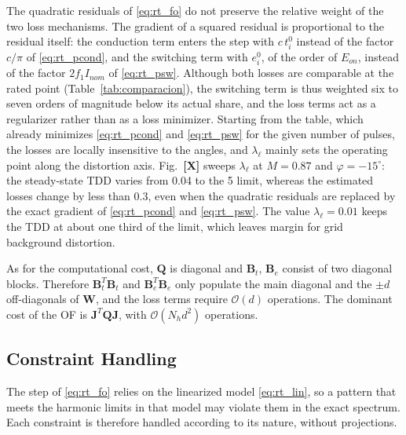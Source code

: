 \documentclass[conference]{IEEEtran}
\newcommand{\pct}{\text{\char`\%}}
\begin{document}
The quadratic residuals of \eqref{eq:rt_fo} do not preserve the relative
weight of the two loss mechanisms. The gradient of a squared residual is
proportional to the residual itself: the conduction term enters the step
with $c\,t_i^0$ instead of the factor $c/\pi$ of \eqref{eq:rt_pcond}, and the
switching term with $e_i^0$, of the order of $E_{on}$, instead of the factor
$2f_1I_{nom}$ of \eqref{eq:rt_psw}. Although both losses are comparable at
the rated point (Table~\ref{tab:comparacion}), the switching term is thus
weighted six to seven orders of magnitude below its actual share, and the
loss terms act as a regularizer rather than as a loss minimizer. Starting
from the table, which already minimizes \eqref{eq:rt_pcond} and
\eqref{eq:rt_psw} for the given number of pulses, the losses are locally
insensitive to the angles, and $\lambda_\ell$ mainly sets the operating point
along the distortion axis. Fig.~\textbf{[X]} sweeps $\lambda_\ell$ at
$M=0.87$ and $\varphi=-15^\circ$: the steady-state TDD varies from
0.04\pct{} to the 5\pct{} limit, whereas the estimated losses change by less
than 0.3\pct{}, even when the quadratic residuals are replaced by the exact
gradient of \eqref{eq:rt_pcond} and \eqref{eq:rt_psw}. The value
$\lambda_\ell=0.01$ keeps the TDD at about one third of the limit, which
leaves margin for grid background distortion.

As for the computational cost, $\mathbf{Q}$ is diagonal and $\mathbf{B}_t$,
$\mathbf{B}_e$ consist of two diagonal blocks. Therefore
$\mathbf{B}_t^T\mathbf{B}_t$ and $\mathbf{B}_e^T\mathbf{B}_e$ only populate
the main diagonal and the $\pm d$ off-diagonals of $\mathbf{W}$, and the
loss terms require $\mathcal{O}(d)$ operations. The dominant cost of the OF
is $\mathbf{J}^T\mathbf{Q}\mathbf{J}$, with $\mathcal{O}(N_h d^2)$
operations.

\subsection{Constraint Handling}
\label{subsec:rt_con}

The step of \eqref{eq:rt_fo} relies on the linearized model
\eqref{eq:rt_lin}, so a pattern that meets the harmonic limits in that
model may violate them in the exact spectrum. Each constraint is therefore
handled according to its nature, without projections.
\end{document}
